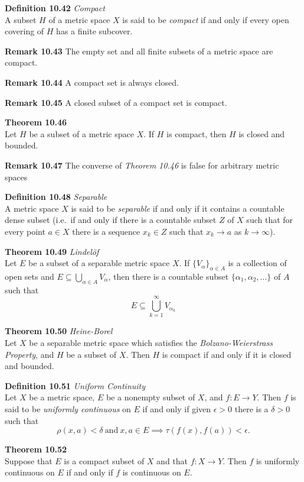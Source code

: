 \documentclass[8pt,landscape]{article}
\begin{document}
\begin{multicols}{3}
\textbf{Definition 10.42} \emph{Compact} \\
A subset $H$ of a metric space $X$ is said to be \emph{compact} if and only if every
open covering of $H$ has a finite subcover.


\textbf{Remark 10.43}
The empty set and all finite subsets of a metric space are compact.


\textbf{Remark 10.44}
A compact set is always closed.


\textbf{Remark 10.45}
A closed subset of a compact set is compact.


\textbf{Theorem 10.46} \\
Let $H$ be a subset of a metric space $X$.
If $H$ is compact, then $H$ is closed and bounded.


\textbf{Remark 10.47}
The converse of \emph{Theorem 10.46} is false for arbitrary metric spaces


\textbf{Definition 10.48} \emph{Separable} \\
A metric space $X$ is said to be \emph{separable} if and only if it contains a
countable dense subset
(i.e.\ if and only if there is a countable subset $Z$ of $X$ such that for every
point $a \in X$ there is a sequence $x_k \in Z$ such that $x_k \to a$ as
$k \to \infty$).


\textbf{Theorem 10.49} \emph{Lindel\"of} \\
Let $E$ be a subset of a separable metric space $X$.
If ${\{V_\alpha\}}_{\alpha \in A}$ is a collection of open sets and
$E \subseteq \bigcup_{\alpha \in A} V_\alpha$, then there is a countable subset
$\{ \alpha_1, \alpha_2, \ldots \}$ of $A$ such that
\[
    E \subseteq \bigcup_{k=1}^\infty V_{\alpha_k}
\]

\textbf{Theorem 10.50} \emph{Heine-Borel} \\
Let $X$ be a separable metric space which satisfies the
\emph{Bolzano-Weierstrass Property}, and $H$ be a subset of $X$.
Then $H$ is compact if and only if it is closed and bounded.

\textbf{Definition 10.51} \emph{Uniform Continuity} \\
Let $X$ be a metric space, $E$ be a nonempty subset of $X$, and $f : E \to Y$.
Then $f$ is said to be \emph{uniformly continuous} on $E$ if and only if given
$\epsilon > 0$ there is a $\delta > 0$ such that
\[
    \rho (x, a) < \delta \ \text{and} \ x, a \in E \implies
    \tau (f(x), f(a)) < \epsilon.
\]

\textbf{Theorem 10.52} \\
Suppose that $E$ is a compact subset of $X$ and that $f : X \to Y$.
Then $f$ is uniformly continuous on $E$ if and only if $f$ is continuous on $E$.


\end{multicols}
\end{document}
